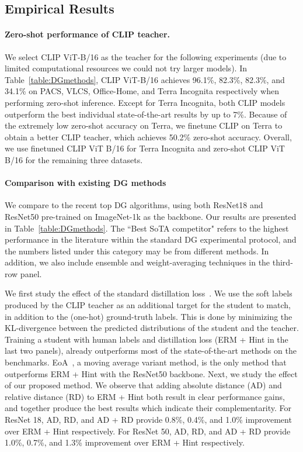 \documentclass[10pt,twocolumn,letterpaper]{article}
\begin{document}
\subsection{Empirical Results}

\paragraph{Zero-shot performance of CLIP teacher.}
We select CLIP ViT-B/16 as the teacher for the following experiments (due to limited computational resources we could not try larger models). In Table~\ref{table:DGmethods}, CLIP ViT-B/16 achieves 96.1\%, 82.3\%, 82.3\%, and 34.1\% on PACS, VLCS, Office-Home, and Terra Incognita respectively when performing zero-shot inference. Except for Terra Incognita, both CLIP models outperform the best individual state-of-the-art results by up to 7\%. 
Because of the extremely low zero-shot accuracy on Terra, we finetune CLIP on Terra to obtain a better CLIP teacher, which achieves 50.2\% zero-shot accuracy.
Overall, we use finetuned CLIP ViT B/16 for Terra Incognita and zero-shot CLIP ViT B/16 for the remaining three datasets.



\vspace{-10pt}
\paragraph{Comparison with existing DG methods} 
We compare to the recent top DG algorithms, using both ResNet18 and ResNet50 pre-trained on ImageNet-1k as the backbone. Our results are presented in Table~\ref{table:DGmethods}. The ``Best SoTA competitor" refers to the highest performance in the literature within the standard DG experimental protocol, and the numbers listed under this category may be from different methods. In addition, we also include ensemble and weight-averaging techniques in the third-row panel.

We first study the effect of the standard distillation loss~\cite{hinton2015distilling}. We use the soft labels produced by the CLIP teacher as an additional target for the student to match, in addition to the (one-hot) ground-truth labels. This is done by minimizing the KL-divergence between the predicted distributions of the student and the teacher. Training a student with human labels and distillation loss (ERM + Hint in the last two panels), already outperforms most of the state-of-the-art methods on the benchmarks. EoA~\cite{arpit2021ensemble}, a moving average variant method, is the only method that outperforms ERM + Hint with the ResNet50 backbone.  
Next, we study the effect of our proposed method. We observe that adding absolute distance (AD) and relative distance (RD) to ERM + Hint both result in clear performance gains, and together produce the best results which indicate their complementarity. For ResNet 18, AD, RD, and AD + RD provide 0.8\%, 0.4\%, and 1.0\% improvement over ERM + Hint respectively. For ResNet 50, AD, RD, and AD + RD provide 1.0\%, 0.7\%, and 1.3\% improvement over ERM + Hint respectively.
\end{document}
